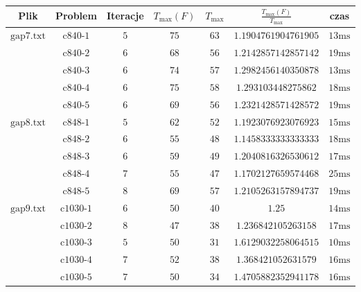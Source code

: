 \begin{tabular}{ccccccc}
    Plik               & Problem          & Iteracje & $T_{\max}(F)$ & $T_{\max}$ & $ \frac{T_{\max}(F)}{T_{\max}} $ & czas          \\ \hline
    $\text{gap7.txt}$  & $\text{c840-1}$  & $5$      & $75$          & $63$       & $1.1904761904761905$             & $\text{13ms}$ \\
     & $\text{c840-2}$  & $6$      & $68$          & $56$       & $1.2142857142857142$             & $\text{19ms}$ \\
     & $\text{c840-3}$  & $6$      & $74$          & $57$       & $1.2982456140350878$             & $\text{13ms}$ \\
     & $\text{c840-4}$  & $6$      & $75$          & $58$       & $1.293103448275862$              & $\text{18ms}$ \\
     & $\text{c840-5}$  & $6$      & $69$          & $56$       & $1.2321428571428572$             & $\text{19ms}$ \\ \hline
    $\text{gap8.txt}$  & $\text{c848-1}$  & $5$      & $62$          & $52$       & $1.1923076923076923$             & $\text{15ms}$ \\
     & $\text{c848-2}$  & $6$      & $55$          & $48$       & $1.1458333333333333$             & $\text{18ms}$ \\
     & $\text{c848-3}$  & $6$      & $59$          & $49$       & $1.2040816326530612$             & $\text{17ms}$ \\
     & $\text{c848-4}$  & $7$      & $55$          & $47$       & $1.1702127659574468$             & $\text{25ms}$ \\
     & $\text{c848-5}$  & $8$      & $69$          & $57$       & $1.2105263157894737$             & $\text{19ms}$ \\ \hline
    $\text{gap9.txt}$  & $\text{c1030-1}$ & $6$      & $50$          & $40$       & $1.25$                           & $\text{14ms}$ \\
     & $\text{c1030-2}$ & $8$      & $47$          & $38$       & $1.236842105263158$              & $\text{17ms}$ \\
     & $\text{c1030-3}$ & $5$      & $50$          & $31$       & $1.6129032258064515$             & $\text{10ms}$ \\
     & $\text{c1030-4}$ & $7$      & $52$          & $38$       & $1.368421052631579$              & $\text{16ms}$ \\
     & $\text{c1030-5}$ & $7$      & $50$          & $34$       & $1.4705882352941178$             & $\text{16ms}$ \\ \hline

\end{tabular}
